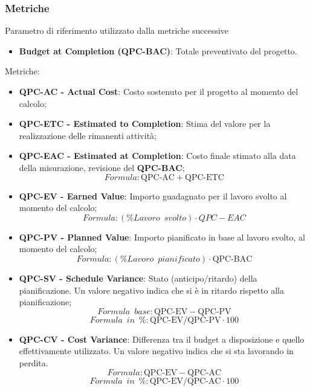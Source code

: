 \subsubsection{Metriche}
Parametro di riferimento utilizzato dalla metriche successive\\
\begin{itemize}
    \item \textbf{Budget at Completion (QPC-BAC)}: Totale preventivato del progetto.
\end{itemize}
Metriche:\\
\begin{itemize}
    \item \textbf{QPC-AC - Actual Cost}: Costo sostenuto per il progetto al momento del calcolo;
    \item \textbf{QPC-ETC - Estimated to Completion}: Stima del valore per la realizzazione delle rimanenti attività;
    \item \textbf{QPC-EAC - Estimated at Completion}: Costo finale stimato alla data della misurazione, revisione del \textbf{QPC-BAC}; $$Formula: \textrm{QPC-AC} + \textrm{QPC-ETC}$$
    \item \textbf{QPC-EV - Earned Value}: Importo guadagnato per il lavoro svolto al momento del calcolo; $$Formula: (\%Lavoro \enspace svolto) \cdot QPC-EAC$$
    \item \textbf{QPC-PV - Planned Value}: Importo pianificato in base al lavoro svolto, al momento del calcolo; $$Formula: (\%Lavoro \enspace pianificato) \cdot \textrm{QPC-BAC}$$
    \item \textbf{QPC-SV - Schedule Variance}: Stato (anticipo/ritardo) della pianificazione. Un valore negativo indica che si è in ritardo rispetto alla pianificazione; $$Formula \enspace base: \textrm{QPC-EV} - \textrm{QPC-PV}$$ $$Formula \enspace in \enspace \%: \textrm{QPC-EV} / \textrm{QPC-PV} \cdot 100$$
    \item \textbf{QPC-CV - Cost Variance}: Differenza tra il budget a disposizione e quello effettivamente utilizzato. Un valore negativo indica che si sta lavorando in perdita. $$Formula: \textrm{QPC-EV} - \textrm{QPC-AC}$$ $$Formula \enspace in \enspace \%: \textrm{QPC-EV} / \textrm{QPC-AC} \cdot 100$$
\end{itemize}
